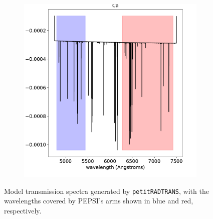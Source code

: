 \documentclass[twocolumn]{aastex631}
\newcommand{\code}[1]{\texttt{#1}}
\begin{document}
\begin{figure}[ht!]
\begin{subfigure}[b]{0.3\textwidth}
                \end{subfigure}
                \begin{subfigure}[b]{0.3\textwidth}\label{fig:Ca-spectrum}
                    \centering
                    \includegraphics[width=\textwidth]{plots/spectra/spectrum.KELT-20b.Ca.2.101e-08.inverted-transmission-better.pdf}
                    
                \end{subfigure}
                \caption{Model transmission spectra generated by \code{petitRADTRANS}, with the wavelengths covered by PEPSI's arms shown in blue and red, respectively.}
                
            \end{figure}
        
\end{document}
